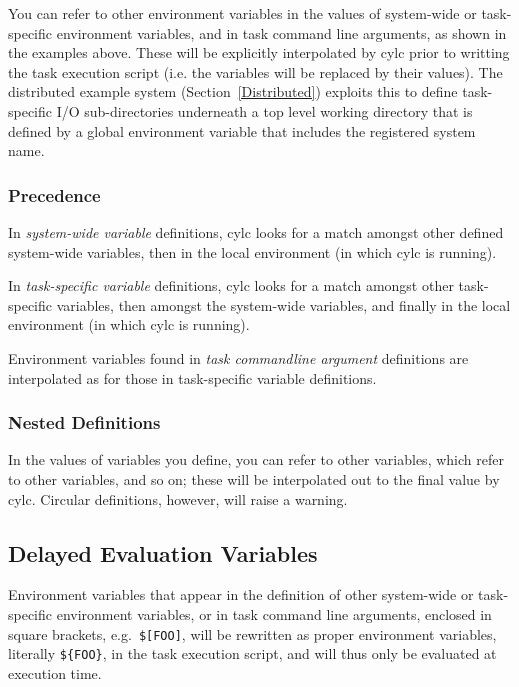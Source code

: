\documentclass[11pt,a4paper]{article}
\begin{document}
\lstset{language=bash}

You can refer to other environment variables in the values of
system-wide or task-specific environment variables, and in task command
line arguments, as shown in the examples above. These will be explicitly
interpolated by cylc prior to writting the task execution script (i.e.
the variables will be replaced by their values). The distributed example
system (Section~\ref{Distributed}) exploits this to define task-specific
I/O sub-directories underneath a top level working directory that is
defined by a global environment variable that includes the registered
system name.

\subsubsection{Precedence}

In {\em system-wide variable} definitions, cylc looks for a match
amongst other defined system-wide variables, then in the local
environment (in which cylc is running).

In {\em task-specific variable} definitions, cylc looks for a match
amongst other task-specific variables, then amongst the system-wide
variables, and finally in the local environment (in which cylc is
running).

Environment variables found in {\em task commandline argument}
definitions are interpolated as for those in task-specific variable
definitions.

\subsubsection{Nested Definitions}

In the values of variables you define, you can refer to other variables,
which refer to other variables, and so on; these will be interpolated
out to the final value by cylc.  Circular definitions, however, will
raise a warning.

\subsection{Delayed Evaluation Variables}
\label{DelayedEvaluationVariables}

Environment variables that appear in the definition of other system-wide
or task-specific environment variables, or in task command line arguments,
enclosed in square brackets, e.g.\ \lstinline=$[FOO]=, will be rewritten as 
proper environment variables, literally \lstinline=${FOO}=, in the task
execution script, and will thus only be evaluated at execution time.
\end{document}
